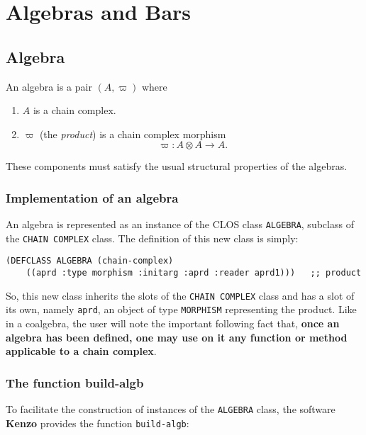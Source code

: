 \chapter{Algebras and Bars}

\section{Algebra}

An algebra  is a pair $(A, \varpi)$ where
\begin{enumerate}
\item $A$ is a chain complex.
\item $\varpi$ (the {\em product}) is a chain complex morphism 
$$\varpi:  A \otimes A  \rightarrow A.$$
\end{enumerate}

These components must satisfy the usual structural properties of the algebras.

\subsection {Implementation of an algebra}

An algebra  is represented as an instance 
of the CLOS class {\tt ALGEBRA}, subclass
of the {\tt CHAIN COMPLEX} class. The definition of this new class is simply:
{\footnotesize\begin{verbatim}
(DEFCLASS ALGEBRA (chain-complex)
    ((aprd :type morphism :initarg :aprd :reader aprd1)))   ;; product
\end{verbatim}}

So, this new class inherits the slots of the {\tt CHAIN COMPLEX} class and has a slot
of its own, namely {\tt aprd}, an  object of type {\tt MORPHISM} representing the product. Like in a coalgebra, 
the user will note the important following fact that, {\bf once an algebra has been defined, one may use on it any
function or method applicable to a chain complex}. 

\subsection {The function build-algb}

To facilitate the construction of instances of the {\tt ALGEBRA} class,
the software {\bf Kenzo} provides the function {\tt build-algb}:

